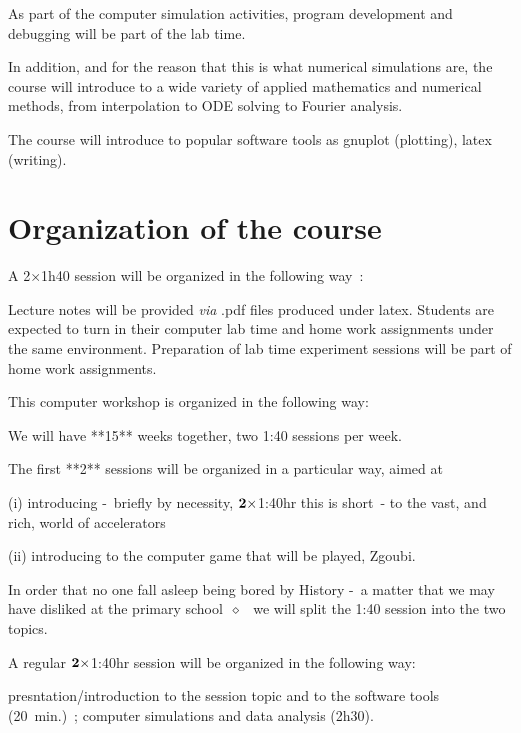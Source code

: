 \documentclass[12pt]{article}
\newcommand{\sid}{{\small \ensuremath{\diamond}}~}
\begin{document}
As part of the computer simulation activities,  program development and debugging will be part of the lab time. 

\bigskip

In addition, and for the reason that this is what numerical simulations are,  
the course will  introduce to a wide variety of applied mathematics and numerical methods, from 
interpolation  to ODE solving to Fourier analysis. 

The course will introduce to popular software tools as  gnuplot (plotting),  latex (writing). 

\bigskip

\section*{Organization of the course}

A 2$\times$1h40  session 
will be organized in the following way~: 



\bigskip

Lecture notes will be provided \textsl{via} .pdf files produced under latex. Students are expected to turn in their 
computer lab time and home work assignments under the same environment. 
Preparation of lab time experiment sessions will be part of home work assignments.

 




This computer workshop is organized in the following way:


We will have **15** weeks together, two 1:40 sessions per week. 

The first **2** sessions will be organized in a particular way, aimed at 

(i) introducing -~briefly by necessity, $\bf 2\times $1:40hr this is short~- to the vast, and rich, world of accelerators

(ii) introducing to the computer game that will be played, Zgoubi. 

In order that no one fall asleep being bored by History -~a matter that we may have disliked at the primary school~\sid 
we will split the 1:40 session into the two topics.


A regular $\bf 2\times $1:40hr session will be organized in the following way:

presntation/introduction to the session topic and to the software tools (20~min.)~; computer simulations and data analysis (2h30). 
\end{document}
